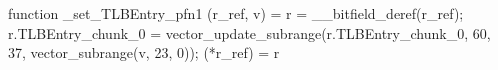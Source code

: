 function _set_TLBEntry_pfn1 (r_ref, v) = {
    r = __bitfield_deref(r_ref);
    r.TLBEntry_chunk_0 = vector_update_subrange(r.TLBEntry_chunk_0, 60, 37, vector_subrange(v, 23, 0));
    (*r_ref) = r
}

